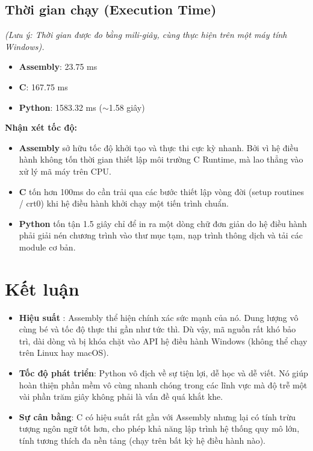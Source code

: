 \documentclass[12pt,a4paper]{article}
\begin{document}
\subsection{Thời gian chạy (Execution Time)}
\textit{(Lưu ý: Thời gian được đo bằng mili-giây, cùng thực hiện trên một máy tính Windows).}
\begin{itemize}
    \item \textbf{Assembly}: 23.75 ms
    \item \textbf{C}: 167.75 ms
    \item \textbf{Python}: 1583.32 ms ($\sim$1.58 giây)
\end{itemize}

\textbf{Nhận xét tốc độ:}
\begin{itemize}
    \item \textbf{Assembly} sở hữu tốc độ khởi tạo và thực thi cực kỳ nhanh. Bởi vì hệ điều hành không tốn thời gian thiết lập môi trường C Runtime, mà lao thẳng vào xử lý mã máy trên CPU.
    \item \textbf{C} tốn hơn 100ms do cần trải qua các bước thiết lập vòng đời (setup routines / crt0) khi hệ điều hành khởi chạy một tiến trình chuẩn.
    \item \textbf{Python} tốn tận 1.5 giây chỉ để in ra một dòng chữ đơn giản do hệ điều hành phải giải nén chương trình vào thư mục tạm, nạp trình thông dịch và tải các module cơ bản.
\end{itemize}

\section{Kết luận}
\begin{itemize}
    \item \textbf{Hiệu suất }: Assembly  thể hiện chính xác sức mạnh của nó. Dung lượng vô cùng bé và tốc độ thực thi gần như tức thì. Dù vậy, mã nguồn rất khó bảo trì, dài dòng và bị khóa chặt vào API hệ điều hành Windows (không thể chạy trên Linux hay macOS).
    \item \textbf{Tốc độ phát triển}: Python vô địch về sự tiện lợi, dễ học và dễ viết. Nó giúp hoàn thiện phần mềm vô cùng nhanh chóng trong các lĩnh vực mà độ trễ một vài phần trăm giây không phải là vấn đề quá khắt khe.
    \item \textbf{Sự cân bằng}: C có hiệu suất rất gần với Assembly nhưng lại có tính trừu tượng ngôn ngữ tốt hơn, cho phép khả năng lập trình hệ thống quy mô lớn, tính tương thích đa nền tảng (chạy trên bất kỳ hệ điều hành nào).
\end{itemize}
\end{document}
